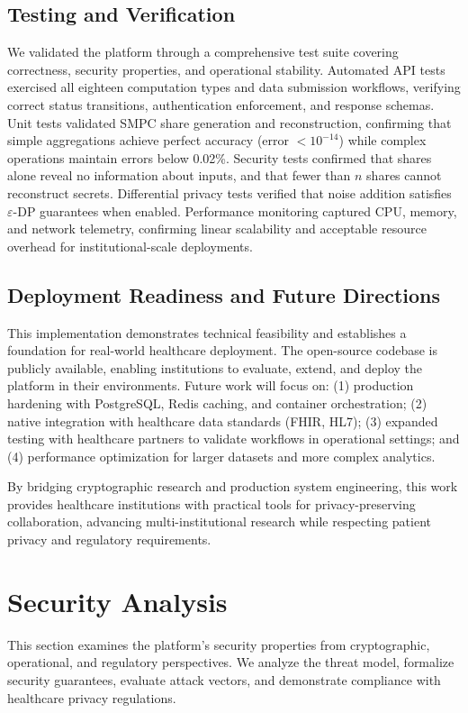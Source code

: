 \documentclass[conference]{IEEEtran}
\begin{document}
\subsection{Testing and Verification}
We validated the platform through a comprehensive test suite covering correctness, security properties, and operational stability. Automated API tests exercised all eighteen computation types and data submission workflows, verifying correct status transitions, authentication enforcement, and response schemas. Unit tests validated SMPC share generation and reconstruction, confirming that simple aggregations achieve perfect accuracy (error $< 10^{-14}$) while complex operations maintain errors below 0.02\%. Security tests confirmed that shares alone reveal no information about inputs, and that fewer than $n$ shares cannot reconstruct secrets. Differential privacy tests verified that noise addition satisfies $\varepsilon$-DP guarantees when enabled. Performance monitoring captured CPU, memory, and network telemetry, confirming linear scalability and acceptable resource overhead for institutional-scale deployments.

\subsection{Deployment Readiness and Future Directions}
This implementation demonstrates technical feasibility and establishes a foundation for real-world healthcare deployment. The open-source codebase is publicly available, enabling institutions to evaluate, extend, and deploy the platform in their environments. Future work will focus on: (1) production hardening with PostgreSQL, Redis caching, and container orchestration; (2) native integration with healthcare data standards (FHIR, HL7); (3) expanded testing with healthcare partners to validate workflows in operational settings; and (4) performance optimization for larger datasets and more complex analytics.

By bridging cryptographic research and production system engineering, this work provides healthcare institutions with practical tools for privacy-preserving collaboration, advancing multi-institutional research while respecting patient privacy and regulatory requirements.

\section{Security Analysis}
This section examines the platform's security properties from cryptographic, operational, and regulatory perspectives. We analyze the threat model, formalize security guarantees, evaluate attack vectors, and demonstrate compliance with healthcare privacy regulations.
\end{document}
